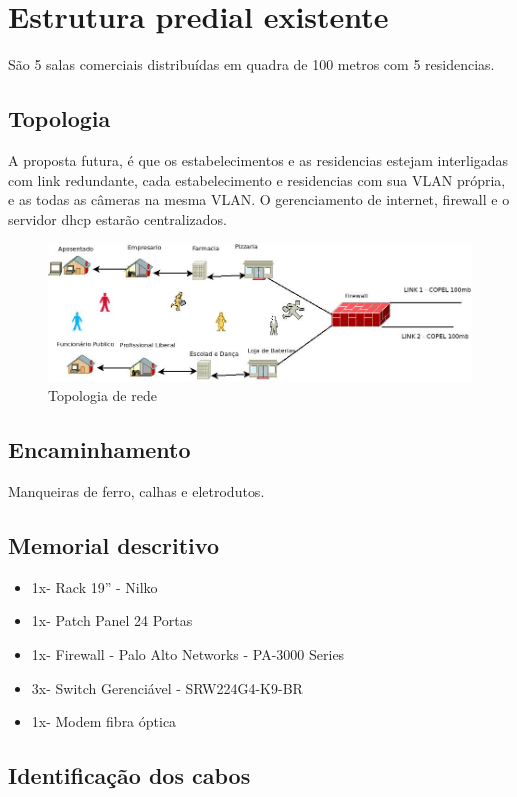 \documentclass[	DIV=calc,%
							paper=a4,%
							fontsize=12pt,%
							onecolumn]{scrartcl}	 					%
\begin{document}
\section{Estrutura predial existente}
São 5 salas comerciais distribuídas em quadra de 100 metros com 5 residencias.


\subsection{Topologia}
A proposta futura, é que os estabelecimentos e as residencias estejam interligadas com link redundante, cada estabelecimento e residencias com sua VLAN própria, e as todas as câmeras na mesma VLAN. O gerenciamento de internet, firewall e o servidor dhcp estarão centralizados.

\begin{figure}
	\centering
	\includegraphics[]{rede}
	\caption{Topologia de rede}
	\label{rede}
\end{figure}

\subsection{Encaminhamento}
Manqueiras de ferro, calhas e eletrodutos.

\subsection{Memorial descritivo}
\begin{itemize}
\item 1x- Rack 19'' - Nilko
\item 1x- Patch Panel 24 Portas
\item 1x- Firewall - Palo Alto Networks - PA-3000 Series
\item 3x- Switch Gerenciável - SRW224G4-K9-BR
\item 1x- Modem fibra óptica
\end{itemize}


\subsection{Identificação dos cabos}
\end{document}
